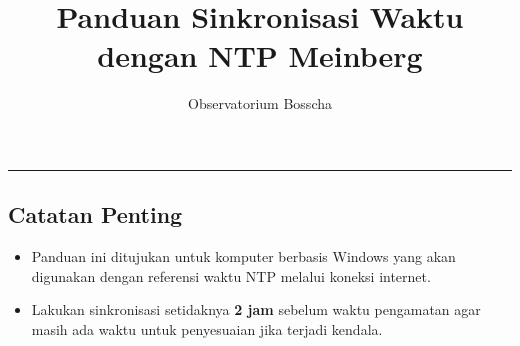 \documentclass[12pt,a4paper]{article}
\title{\textbf{Panduan Sinkronisasi Waktu dengan NTP Meinberg}}
\author{Observatorium Bosscha}
\begin{document}
\maketitle
\noindent\rule{\linewidth}{0.4pt}

\subsection*{Catatan Penting}
\begin{itemize}
	\item Panduan ini ditujukan untuk komputer berbasis Windows yang akan digunakan dengan referensi waktu NTP melalui koneksi internet.
	\item Lakukan sinkronisasi setidaknya \textbf{2 jam} sebelum waktu pengamatan agar masih ada waktu untuk penyesuaian jika terjadi kendala.
\end{itemize}
\end{document}
